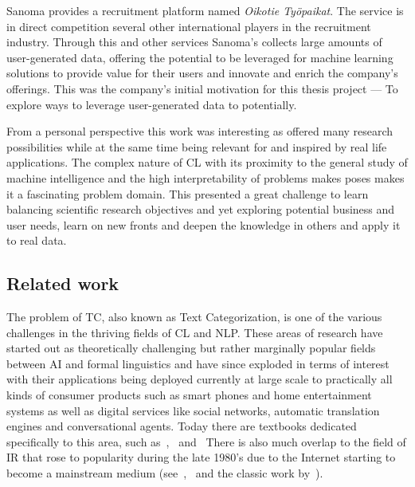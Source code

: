 Sanoma provides a recruitment platform named \emph{Oikotie Työpaikat}. The service is in direct competition several other international players in the recruitment industry. Through this and other services Sanoma's collects large amounts of user-generated data, offering the potential to be leveraged for machine learning solutions to provide value for their users and innovate and enrich the company's offerings.
This was the company's initial motivation for this thesis project --- To explore ways to leverage user-generated data to potentially.



From a personal perspective this work was interesting as offered many research possibilities while at the same time being relevant for and inspired by real life applications. The complex nature of \acrlong{CL} with its proximity to the general study of machine intelligence and the high interpretability of problems makes poses makes it a fascinating problem domain. This presented a great challenge to learn balancing scientific research objectives and yet exploring potential business and user needs, learn on new fronts and deepen the knowledge in others and apply it to real data.

\subsection{Related work}
\label{sub:Related work}

The problem of \gls{TC}, also known as Text Categorization, is one of the various challenges in the thriving fields of \acrfull{CL} and \gls{NLP}. These areas of research have started out as theoretically challenging but rather marginally popular fields between \acrfull{AI} and formal linguistics and have since exploded in terms of interest with their applications being deployed currently at large scale to practically all kinds of consumer products such as smart phones and home entertainment systems as well as digital services like social networks, automatic translation engines and conversational agents.
Today there are textbooks dedicated specifically to this area, such as~\cite{Manning:1999aa},~\cite{Jurafsky:2014aa} and~\cite{Clark:2013aa} There is also much overlap to the field of \gls{IR} that rose to popularity during the late 1980's due to the Internet starting to become a mainstream medium (see~\cite{Manning:2008aa},~\cite{Leskovec:2014aa} and the classic work by~\cite{Rijsbergen:1979aa}).

